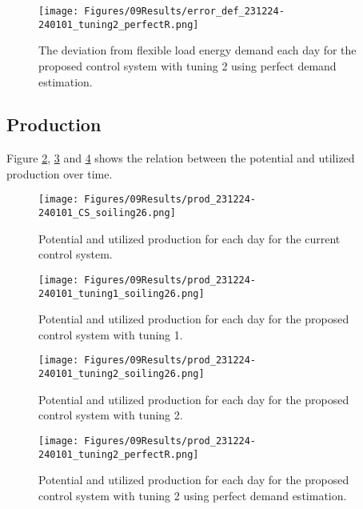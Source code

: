 \begin{figure}[h]
    \centering
    \texttt{[image: Figures/09Results/error\_def\_231224-240101\_tuning2\_perfectR.png]}
    \caption[Flexible load deviation proposed control system 2 perfect R]{The deviation from flexible load energy demand each day for the proposed control system with tuning 2 using perfect demand estimation. }
    \label{fig:error_def_231224-240101_tuning2_perfectR}
\end{figure}

\subsection{Production}

Figure \ref{fig:prod_231224-240101_CS_soiling26}, \ref{fig:prod_231224-240101_tuning1_soiling26} and \ref{fig:prod_231224-240101_tuning2_soiling26} shows the relation between the potential and utilized production over time. 

\begin{figure}[h]
    \centering
    \texttt{[image: Figures/09Results/prod\_231224-240101\_CS\_soiling26.png]}
    \caption[Potential and utilized production current control system]{Potential and utilized production for each day for the current control system. }
    \label{fig:prod_231224-240101_CS_soiling26}
\end{figure}

\begin{figure}[h]
    \centering
    \texttt{[image: Figures/09Results/prod\_231224-240101\_tuning1\_soiling26.png]}
    \caption[Potential and utilized production proposed control system 1]{Potential and utilized production for each day for the proposed control system with tuning 1. }
    \label{fig:prod_231224-240101_tuning1_soiling26}
\end{figure}

\begin{figure}[h]
    \centering
    \texttt{[image: Figures/09Results/prod\_231224-240101\_tuning2\_soiling26.png]}
    \caption[Potential and utilized production proposed control system 2]{Potential and utilized production for each day for the proposed control system with tuning 2. }
    \label{fig:prod_231224-240101_tuning2_soiling26}
\end{figure}

\begin{figure}[h]
    \centering
    \texttt{[image: Figures/09Results/prod\_231224-240101\_tuning2\_perfectR.png]}
    \caption[Potential and utilized production proposed control system 2 perfect R]{Potential and utilized production for each day for the proposed control system with tuning 2 using perfect demand estimation. }
    \label{fig:prod_231224-240101_tuning2_perfectR}
\end{figure}


